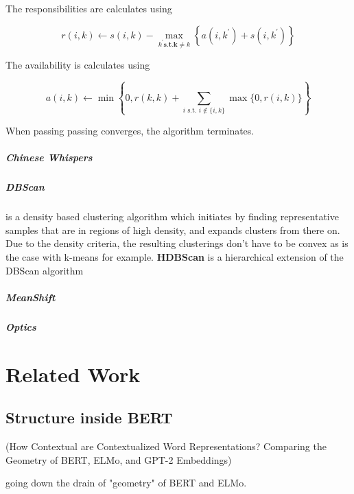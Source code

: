 \documentclass[a4paper,12pt,twoside,openright]{report}
\begin{document}
The responsibilities are calculates using

$$
r(i, k) \leftarrow s(i, k)-\max _{k^{\prime} \mathbf{s . t . k} \neq k}\left\{a\left(i, k^{\prime}\right)+s\left(i, k^{\prime}\right)\right\}
$$

The availability is calculates using 

$$
a(i, k) \leftarrow \min \left\{0, r(k, k)+\sum_{i \text { s.t. } i \notin\{i, k\}} \max \{0, r(i, k)\}\right\}
$$

When passing passing converges, the algorithm terminates.

\paragraph{Chinese Whispers}



\paragraph{DBScan} is a density based clustering algorithm \cite{ester96} which initiates by finding representative samples that are in regions of high density, and expands clusters from there on.
Due to the density criteria, the resulting clusterings don't have to be convex as is the case with k-means for example. \textbf{HDBScan} is a hierarchical extension of the DBScan algorithm \cite{campello13}

\paragraph{MeanShift}

\paragraph{Optics}



\chapter{Related Work}

\section{Structure inside BERT}

(How Contextual are Contextualized Word Representations? Comparing the Geometry of BERT, ELMo, and GPT-2 Embeddings)

going down the drain of "geometry" of BERT and ELMo.
\end{document}
